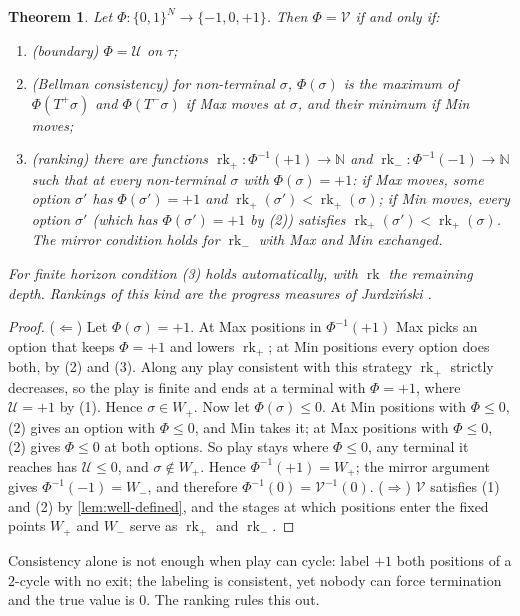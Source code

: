 \documentclass[11pt]{amsart}
\theoremstyle{plain}
\newtheorem{theorem}{Theorem}[section]
\theoremstyle{definition}
\theoremstyle{remark}
\numberwithin{equation}{section}
\newcommand{\NN}{\mathbb{N}}
\newcommand{\val}{\mathcal{V}}            %
\newcommand{\pay}{\mathcal{U}}            %
\newcommand{\rk}{\operatorname{rk}}
\begin{document}
\begin{theorem}\label{thm:local}
Let $\Phi\colon\{0,1\}^N\to\{-1,0,+1\}$. Then $\Phi=\val$ if and only if:
\begin{enumerate}[label=\textup{(\arabic*)}]
\item \textup{(boundary)} $\Phi=\pay$ on $\tau$;
\item \textup{(Bellman consistency)} for non-terminal $\sigma$, $\Phi(\sigma)$ is the maximum of $\Phi(T^{+}\sigma)$ and $\Phi(T^{-}\sigma)$ if Max moves at $\sigma$, and their minimum if Min moves;
\item \textup{(ranking)} there are functions $\rk_{+}\colon\Phi^{-1}(+1)\to\NN$ and $\rk_{-}\colon\Phi^{-1}(-1)\to\NN$ such that at every non-terminal $\sigma$ with $\Phi(\sigma)=+1$: if Max moves, some option $\sigma'$ has $\Phi(\sigma')=+1$ and $\rk_{+}(\sigma')<\rk_{+}(\sigma)$; if Min moves, every option $\sigma'$ \textup{(}which has $\Phi(\sigma')=+1$ by \textup{(2)}\textup{)} satisfies $\rk_{+}(\sigma')<\rk_{+}(\sigma)$. The mirror condition holds for $\rk_{-}$ with Max and Min exchanged.
\end{enumerate}
For finite horizon condition \textup{(3)} holds automatically, with $\rk$ the remaining depth. Rankings of this kind are the progress measures of Jurdzi\'nski \cite{Jurdzinski}.
\end{theorem}

\begin{proof}
($\Leftarrow$) Let $\Phi(\sigma)=+1$. At Max positions in $\Phi^{-1}(+1)$ Max picks an option that keeps $\Phi=+1$ and lowers $\rk_{+}$; at Min positions every option does both, by (2) and (3). Along any play consistent with this strategy $\rk_{+}$ strictly decreases, so the play is finite and ends at a terminal with $\Phi=+1$, where $\pay=+1$ by (1). Hence $\sigma\in W_{+}$.
Now let $\Phi(\sigma)\le 0$. At Min positions with $\Phi\le0$, (2) gives an option with $\Phi\le 0$, and Min takes it; at Max positions with $\Phi\le0$, (2) gives $\Phi\le 0$ at both options. So play stays where $\Phi\le 0$, any terminal it reaches has $\pay\le 0$, and $\sigma\notin W_{+}$. Hence $\Phi^{-1}(+1)=W_{+}$; the mirror argument gives $\Phi^{-1}(-1)=W_{-}$, and therefore $\Phi^{-1}(0)=\val^{-1}(0)$.
($\Rightarrow$) $\val$ satisfies (1) and (2) by \cref{lem:well-defined}, and the stages at which positions enter the fixed points $W_{+}$ and $W_{-}$ serve as $\rk_{+}$ and $\rk_{-}$.
\end{proof}

Consistency alone is not enough when play can cycle: label $+1$ both positions of a $2$-cycle with no exit; the labeling is consistent, yet nobody can force termination and the true value is $0$. The ranking rules this out.
\end{document}
